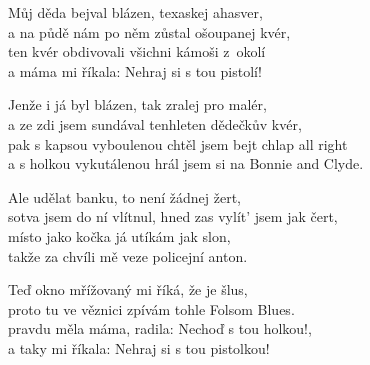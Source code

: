 
\ve{}
Můj děda bejval blázen, texaskej ahasver,\\
a na půdě nám po něm zůstal ošoupanej kvér,\\
ten kvér obdivovali všichni kámoši z~okolí\\
a máma mi říkala: Nehraj si s tou pistolí!

\ve{}
Jenže i já byl blázen, tak zralej pro malér,\\
a ze zdi jsem sundával tenhleten dědečkův kvér,\\
pak s kapsou vyboulenou chtěl jsem bejt chlap all right\\
a s holkou vykutálenou hrál jsem si na Bonnie and Clyde.

\ve{}
Ale udělat banku, to není žádnej žert,\\
sotva jsem do ní vlítnul, hned zas vylít' jsem jak čert,\\
místo jako kočka já utíkám jak slon,\\
takže za chvíli mě veze policejní anton.

\ve{}
Teď okno mřížovaný mi říká, že je šlus,\\
proto tu ve věznici zpívám tohle Folsom Blues.\\
pravdu měla máma, radila: Nechoď s tou holkou!,\\
a taky mi říkala: Nehraj si s tou pistolkou!


\esong
